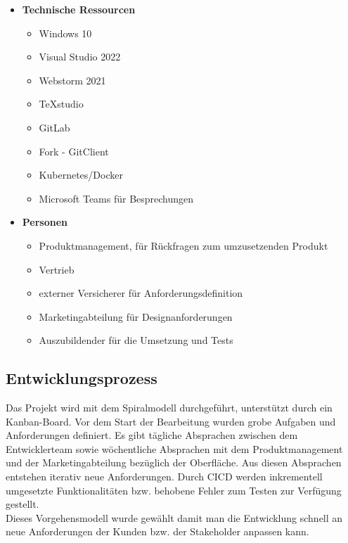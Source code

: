 \begin{itemize}
	\item \textbf{Technische Ressourcen}
	\begin{itemize}
		\item Windows 10
		\item Visual Studio 2022
		\item Webstorm 2021
		\item TeXstudio
		\item GitLab
		\item Fork - GitClient
		\item Kubernetes/Docker
		\item Microsoft Teams für Besprechungen
	\end{itemize}
	\item \textbf{Personen}
	\begin{itemize}
	 	\item Produktmanagement, für Rückfragen zum umzusetzenden Produkt
	 	\item Vertrieb
	 	\item externer Versicherer für Anforderungsdefinition
		\item Marketingabteilung für Designanforderungen
		\item Auszubildender für die Umsetzung und Tests
	\end{itemize}
\end{itemize}

\subsection{Entwicklungsprozess}
\label{entwicklungsprozess}
Das Projekt wird mit dem Spiralmodell durchgeführt, unterstützt durch ein Kanban-Board. Vor dem Start der Bearbeitung wurden grobe Aufgaben und Anforderungen definiert. Es gibt tägliche Absprachen zwischen dem Entwicklerteam sowie wöchentliche Absprachen mit dem Produktmanagement und der Marketingabteilung bezüglich der Oberfläche. Aus diesen Absprachen entstehen iterativ neue Anforderungen. Durch \ac{CICD} werden inkrementell umgesetzte Funktionalitäten bzw. behobene Fehler zum Testen zur Verfügung gestellt. \\
Dieses Vorgehensmodell wurde gewählt damit man die Entwicklung schnell an neue Anforderungen der Kunden bzw. der Stakeholder anpassen kann.